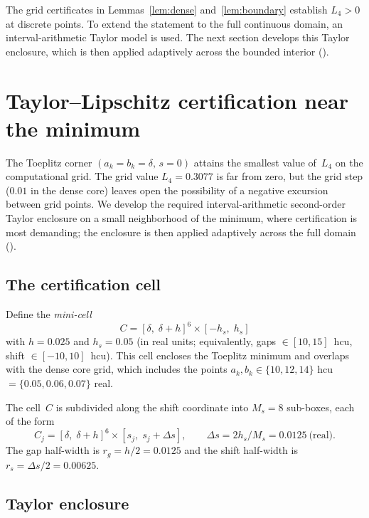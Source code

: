 \documentclass[11pt,a4paper]{amsart}
\theoremstyle{definition}
\theoremstyle{remark}
\begin{document}
The grid certificates in Lemmas~\ref{lem:dense}
and~\ref{lem:boundary} establish $L_4 > 0$ at discrete points.
To extend the statement to the full continuous domain,
an interval-arithmetic Taylor model is used.
The next section develops this Taylor enclosure, which
is then applied adaptively across the bounded interior
().


\section{Taylor--Lipschitz certification near the minimum}\label{sec:taylor}

The Toeplitz corner $(a_k = b_k = \delta,\, s = 0)$ attains the
smallest value of~$L_4$ on the computational grid.
The grid value $L_4 = 0.3077$ is far from zero, but the grid
step ($0.01$ in the dense core) leaves open the possibility of
a negative excursion between grid points.
We develop the required interval-arithmetic second-order
Taylor enclosure on a small neighborhood of the minimum,
where certification is most demanding; the enclosure is then
applied adaptively across the full domain ().

\subsection{The certification cell}

Define the \emph{mini-cell}
\[
  C = [\delta,\;\delta + h]^6 \times [-h_s,\; h_s]
\]
with $h = 0.025$ and $h_s = 0.05$ (in real units;
equivalently, gaps $\in [10, 15]$~hcu, shift $\in [-10, 10]$~hcu).
This cell encloses the Toeplitz minimum and overlaps with
the dense core grid, which includes the points
$a_k, b_k \in \{10, 12, 14\}$ hcu $= \{0.05, 0.06, 0.07\}$ real.

The cell~$C$ is subdivided along the shift coordinate into
$M_s = 8$ sub-boxes, each of the form
\[
  C_j = [\delta,\;\delta{+}h]^6 \times [s_j,\; s_j + \Delta s],
  \qquad \Delta s = 2h_s / M_s = 0.0125~\text{(real)}.
\]
The gap half-width is $r_g = h/2 = 0.0125$ and the shift
half-width is $r_s = \Delta s / 2 = 0.00625$.

\subsection{Taylor enclosure}
\end{document}
